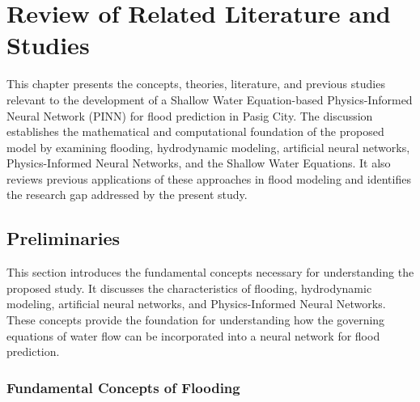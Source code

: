 
\chapter{Review of Related Literature and Studies}

\label{chap:review}


This chapter presents the concepts, theories, literature, and previous studies relevant to the development of a Shallow Water Equation-based Physics-Informed Neural Network (PINN) for flood prediction in Pasig City. The discussion establishes the mathematical and computational foundation of the proposed model by examining flooding, hydrodynamic modeling, artificial neural networks, Physics-Informed Neural Networks, and the Shallow Water Equations. It also reviews previous applications of these approaches in flood modeling and identifies the research gap addressed by the present study.

\section{Preliminaries}


This section introduces the fundamental concepts necessary for understanding the proposed study. It discusses the characteristics of flooding, hydrodynamic modeling, artificial neural networks, and Physics-Informed Neural Networks. These concepts provide the foundation for understanding how the governing equations of water flow can be incorporated into a neural network for flood prediction.

\subsection{Fundamental Concepts of Flooding}



